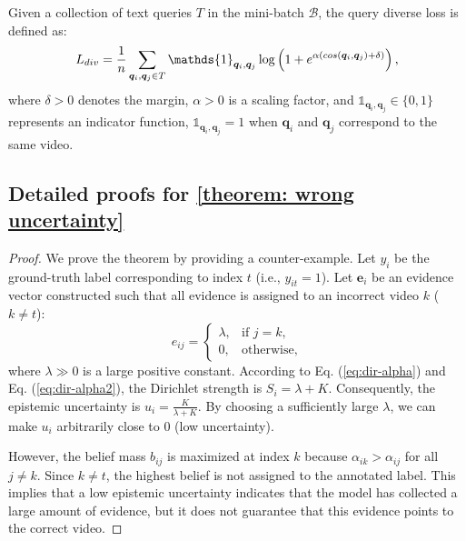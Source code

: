 Given a collection of text queries $T$ in the mini-batch $\mathcal{B}$, the query diverse loss is defined as:
\vspace{-.5em}
\begin{equation}
L_{div} = \frac{1}{n} \sum_{\boldsymbol q_i,\boldsymbol q_j \in {T}} \mathds{1}_{\boldsymbol q_i, \boldsymbol q_j} \log\left(1 + e^{\alpha (cos(\boldsymbol q_i, \boldsymbol q_j) + \delta)}\right),
\vspace{-.5em}
\end{equation}
where $ \delta > 0 $ denotes the margin, $ \alpha > 0 $ is a scaling factor, and $ \mathds{1}_{\boldsymbol q_i, \boldsymbol q_j} \in \{0,1\} $ represents an indicator function,  $ \mathds{1}_{\boldsymbol q_i, \boldsymbol q_j} = 1 $ when  $ \boldsymbol q_i $ and $ \boldsymbol q_j $ correspond to the same video.
\subsection{Detailed proofs for \cref{theorem: wrong uncertainty}}
\label{appendix:theorem3.2}

\begin{proof}
We prove the theorem by providing a counter-example.
Let $y_i$ be the ground-truth label corresponding to index $t$ (i.e., $y_{it}=1$).
Let $\boldsymbol{e}_i$ be an evidence vector constructed such that all evidence is assigned to an incorrect video $k$ ($k \neq t$):
\begin{equation}
    e_{ij} = 
    \begin{cases}
    \lambda, & \text{if } j = k, \\
    0, & \text{otherwise},
    \end{cases}
\end{equation}
where $\lambda \gg 0$ is a large positive constant.
According to Eq. (\ref{eq:dir-alpha}) and Eq. (\ref{eq:dir-alpha2}), the Dirichlet strength is $S_i = \lambda + K$.
Consequently, the epistemic uncertainty is $\displaystyle u_i = \frac{K}{\lambda + K}$. By choosing a sufficiently large $\lambda$, we can make $u_i$ arbitrarily close to 0 (low uncertainty).

However, the belief mass $b_{ij}$ is maximized at index $k$ because $\alpha_{ik} > \alpha_{ij}$ for all $j \neq k$.
Since $k \neq t$, the highest belief is not assigned to the annotated label.
This implies that a low epistemic uncertainty indicates that the model has collected a large amount of evidence, but it does not guarantee that this evidence points to the correct video.
\end{proof}

